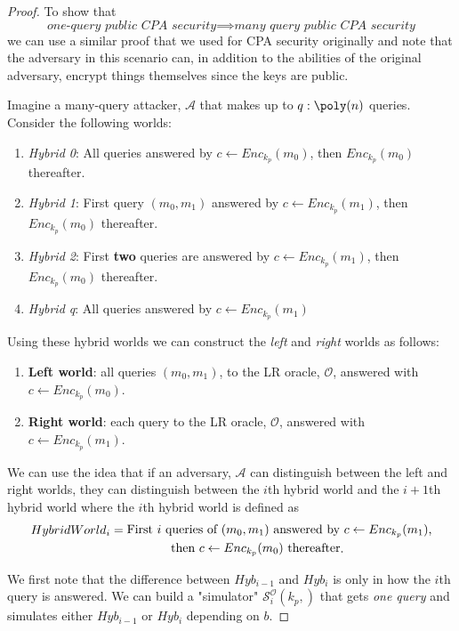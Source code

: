 \begin{proof}
	To show that
	\[
		\textit{one-query public CPA security} \implies \textit{many query public CPA security}
	\]
	we can use a similar proof that we used for CPA security originally and note that the adversary in this scenario can, in addition to the abilities of the original adversary, encrypt things themselves since the keys are public. \par

	Imagine a many-query attacker, \(\mathcal{A} \) that makes up to \(q: \poly (n)\) queries. Consider the following worlds:
	\begin{enumerate}[label=(\roman*)]
		\item \emph{Hybrid 0}: All queries answered by \(c \gets Enc_{k_p}(m_0)\), then \(Enc_{k_p}(m_0)\) thereafter.
		\item \emph{Hybrid 1}: First query \((m_0, m_1)\) answered by \(c \gets Enc_{k_p}(m_1)\), then \(Enc_{k_p}(m_0)\) thereafter.
		\item \emph{Hybrid 2}: First \textbf{two} queries are answered by \(c \gets Enc_{k_p}(m_1)\), then \(Enc_{k_p}(m_0)\) thereafter.
		\item \emph{Hybrid q}: All queries answered by \(c \gets Enc_{k_p}(m_1)\) 
	\end{enumerate}

	Using these hybrid worlds we can construct the \emph{left} and \emph{right} worlds as follows:
	\begin{enumerate}[label=(\roman*)]
		\item \textbf{Left world}: all queries \((m_0, m_1)\), to the LR oracle, \(\mathcal{O} \), answered with \(c \gets Enc_{k_p}(m_0)\).
		\item \textbf{Right world}: each query to the LR oracle, \(\mathcal{O} \), answered with \(c \gets Enc_{k_p}({m_1})\).
	\end{enumerate}

	We can use the idea that if an adversary, \(\mathcal{A} \) can distinguish between the left and right worlds, they can distinguish between the \(i\)th hybrid world and the \(i+1\)th hybrid world where the \(i\)th hybrid world is defined as
	\begin{align*}
		HybridWorld_i &= \vcenter{\hbox{First $i$ queries of $(m_0, m_1)$ answered by $c \gets Enc_{k_p}(m_1)$,}} \\
		&\quad \vcenter{\hbox{\: \: \: \: \: \: \: then $c \gets Enc_{k_p}(m_0)$ thereafter}}.
	\end{align*}
	
	We first note that the difference between \(Hyb_{i - 1}\) and \(Hyb_i\) is only in how the \(i\)th query is answered. We can build a "simulator" \(\mathcal{S}_i^{\mathcal{O}}(k_p,)\) that gets \emph{one query} and simulates either \(Hyb_{i - 1}\) or \(Hyb_i\) depending on \(b\).
\end{proof}


